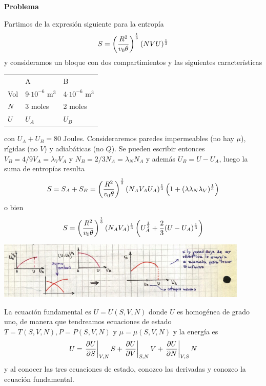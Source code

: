 \documentclass[10pt,oneside]{CBFT_book}
\begin{document}
\begin{ejemplo}{\bf Problema}

Partimos de la expresión siguiente para la entropía 
\[
	S = \left( \frac{ R^2 }{ v_0 \theta  } \right)^{\frac{1}{3}} (NVU)^{\frac{1}{3}}
\]
y consideramos un bloque con dos compartimientos y las siguientes características
\begin{center}
\begin{tabular}{lll}
 	& A & B \\
Vol 	& 9$\cdot 10^{-6}$ m$^3$ & 4$\cdot 10^{-6}$ m$^3$\\
$N$ 	& 3 moles & 2 moles \\
$U$ 	& $U_A$ & $U_B$
\end{tabular}
\end{center}
con $U_A+ U_B = 80$ Joules. Consideraremos paredes impermeables (no hay $\mu$), rígidas (no $V$) 
y adiabáticas (no $Q$).
Se pueden escribir entonces $V_B = 4/9 V_A =\lambda_V V_A$ y $N_B = 2/3 N_A = \lambda_N N_A$ y
además $U_B = U - U_A$, luego la suma de entropías resulta
\[
	S = S_A + S_B = \left( \frac{ R^2 }{  v_0 \theta  } \right)^{\frac 1 3 } (N_A V_A U_A)^{\frac 1 3}
	\left( 1 + ( \lambda \lambda_N \lambda_V )^{\frac 1 3} \right)
\]
o bien
\[
	S =  \left( \frac{ R^2 }{  v_0 \theta  } \right)^{\frac 1 3 } (N_A V_A )^{\frac 1 3}
	\left( U_A^{\frac 1 3} + \frac{2}{3} ( U - U_A )^{\frac 1 3} \right)
\]

\includegraphics[width=0.90\textwidth]{images/1606329021.jpg}
 
La ecuación fundamental es $U=U(S,V,N)$ donde $U$ es homogénea de grado uno, de manera que tendreamos
ecuaciones de estado $T=T(S,V,N), P=P(S,V,N)$ y $\mu=\mu(S,V,N)$ y la energía es
\[
	U = \left.\frac{\partial^{\hspace{-0.05em}} {U}}{\partial {S}^{\hspace{-0.05em}}}\right|_{V,N} S + \left.\frac{\partial^{\hspace{-0.05em}} {U}}{\partial {V}^{\hspace{-0.05em}}}\right|_{S,N} V + \left.\frac{\partial^{\hspace{-0.05em}} {U}}{\partial {N}^{\hspace{-0.05em}}}\right|_{V,S} N
\]
y al conocer las tres ecuaciones de estado, conozco las derivadas y conozco la ecuación fundamental.


\end{ejemplo}
\end{document}
